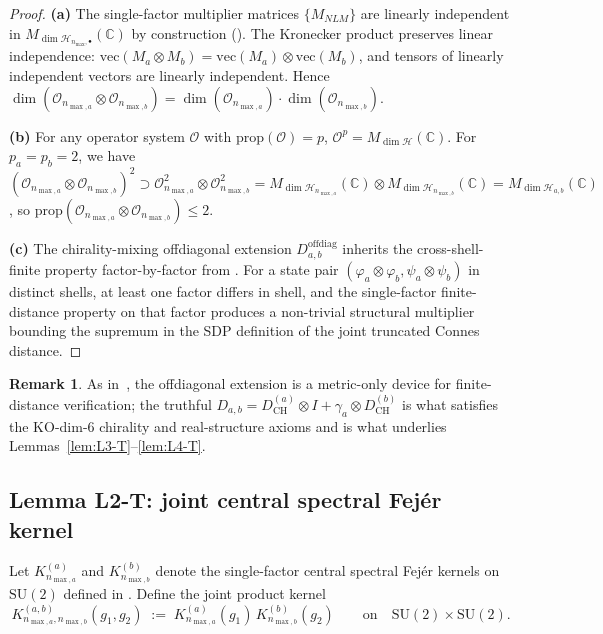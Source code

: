 \documentclass[11pt,a4paper]{article}
\theoremstyle{plain}
\theoremstyle{definition}
\newtheorem{remark}[theorem]{Remark}
\newcommand{\nmax}{n_{\max}}
\newcommand{\nmaxa}{n_{\max,a}}
\newcommand{\nmaxb}{n_{\max,b}}
\newcommand{\Hilb}{\mathcal{H}}
\newcommand{\Op}{\mathcal{O}}
\newcommand{\C}{\mathbb{C}}
\newcommand{\SU}{\mathrm{SU}}
\newcommand{\Mat}{M}
\newcommand{\DCH}{D_{\mathrm{CH}}}
\newcommand{\KS}{K}
\begin{document}
\begin{proof}
\textbf{(a)} The single-factor multiplier matrices $\{\Mat_{NLM}\}$
are linearly independent in $M_{\dim \Hilb_{\nmax,\bullet}}(\C)$ by
construction (\cite[\S 3.1]{loutey_paper38}). The Kronecker product
preserves linear independence: $\mathrm{vec}(\Mat_a \otimes \Mat_b)
= \mathrm{vec}(\Mat_a) \otimes \mathrm{vec}(\Mat_b)$, and tensors of
linearly independent vectors are linearly independent. Hence
$\dim(\Op_{\nmaxa} \otimes \Op_{\nmaxb}) = \dim(\Op_{\nmaxa}) \cdot
\dim(\Op_{\nmaxb})$.

\textbf{(b)} For any operator system $\Op$ with $\mathrm{prop}(\Op) =
p$, $\Op^p = M_{\dim \Hilb}(\C)$. For $p_a = p_b = 2$, we have
$(\Op_{\nmaxa} \otimes \Op_{\nmaxb})^2 \supset \Op_{\nmaxa}^2 \otimes
\Op_{\nmaxb}^2 = M_{\dim \Hilb_{\nmaxa}}(\C) \otimes M_{\dim
\Hilb_{\nmaxb}}(\C) = M_{\dim \Hilb_{a,b}}(\C)$, so
$\mathrm{prop}(\Op_{\nmaxa} \otimes \Op_{\nmaxb}) \le 2$.

\textbf{(c)} The chirality-mixing offdiagonal extension
$D_{a,b}^{\mathrm{offdiag}}$ inherits the cross-shell-finite property
factor-by-factor from \cite[Lemma~3.1]{loutey_paper38}. For a state
pair $(\varphi_a \otimes \varphi_b, \psi_a \otimes \psi_b)$ in
distinct shells, at least one factor differs in shell, and the
single-factor finite-distance property on that factor produces a
non-trivial structural multiplier bounding the supremum
in the SDP definition of the joint truncated Connes distance.
\end{proof}

\begin{remark}\label{rem:offdiag-T}
As in~\cite[Remark~3.2]{loutey_paper38}, the offdiagonal extension is a
metric-only device for finite-distance verification; the truthful
$D_{a,b} = \DCH^{(a)} \otimes I + \gamma_a \otimes \DCH^{(b)}$ is what
satisfies the KO-dim-6 chirality and real-structure axioms and is what
underlies Lemmas~\ref{lem:L3-T}--\ref{lem:L4-T}.
\end{remark}

\subsection{Lemma L2-T: joint central spectral Fej\'er kernel}
\label{sec:L2-T}

Let $\KS^{(a)}_{\nmaxa}$ and $\KS^{(b)}_{\nmaxb}$ denote the
single-factor central spectral Fej\'er kernels on $\SU(2)$ defined in
\cite[Definition~3.3]{loutey_paper38}. Define the joint product kernel
\begin{equation}\label{eq:joint_kernel}
   \KS^{(a,b)}_{\nmaxa, \nmaxb}(g_1, g_2)
   \;:=\; \KS^{(a)}_{\nmaxa}(g_1)\, \KS^{(b)}_{\nmaxb}(g_2)
   \qquad\text{on}\quad \SU(2) \times \SU(2).
\end{equation}
\end{document}

